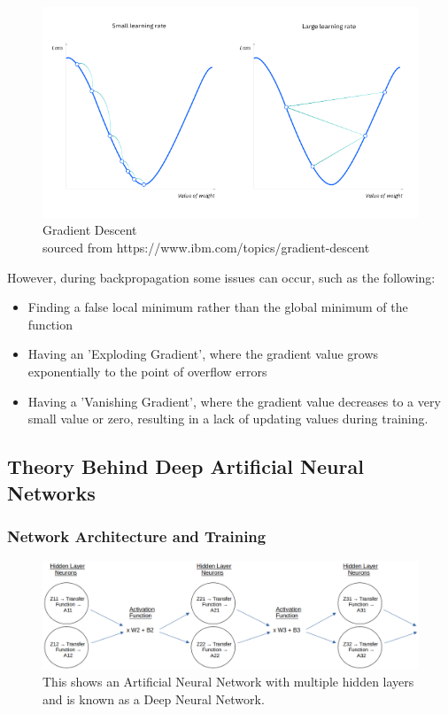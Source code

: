 \documentclass[./project-report/src/latex/project-report.tex]{subfiles}
\begin{document}
\begin{figure}[h!]
\centering
\includegraphics[width=1\textwidth]{./project-report/src/images/gradient-descent.png}
\caption{Gradient Descent\\
        sourced from https://www.ibm.com/topics/gradient-descent}
\end{figure}

\pagebreak

However, during backpropagation some issues can occur, such as the following:

\begin{itemize}
    \item Finding a false local minimum rather than the global minimum of the function
    \item Having an 'Exploding Gradient', where the gradient value grows exponentially to the point of overflow errors
    \item Having a 'Vanishing Gradient', where the gradient value decreases to a very small value or zero, resulting in a lack of updating values during training.
\end{itemize}

\pagebreak

\subsection{Theory Behind Deep Artificial Neural Networks}
\vspace{5mm}

\subsubsection{Network Architecture and Training}

\begin{figure}[h!]
\centering
\includegraphics[width=1\textwidth]{./project-report/src/images/deep-ann-diagram-2.png}
\caption{This shows an Artificial Neural Network with multiple hidden layers and is known as a Deep Neural Network.}
\label{fig:abstract-network}
\end{figure}
\end{document}

